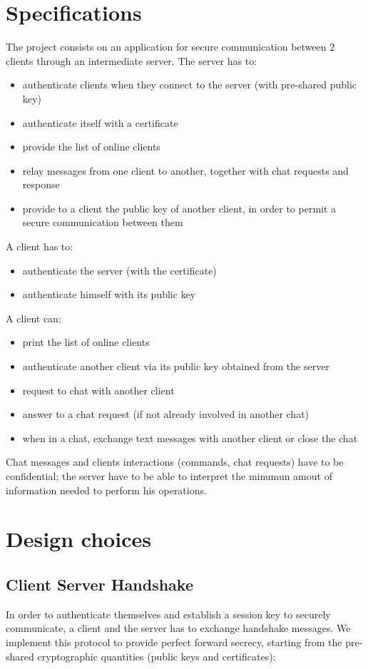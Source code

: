 \documentclass[11pt]{report}
\begin{document}
\chapter{Specifications}
	\noindent The project consists on an application for secure communication between 2 clients through an intermediate server.
	\newline
	The server has to:
	\begin{itemize}
		\item authenticate clients when they connect to the server (with pre-shared public key)
		\item authenticate itself with a certificate
		\item provide the list of online clients
		\item relay messages from one client to another, together with chat requests and response
		\item provide to a client the public key of another client, in order to permit a secure communication between them
	\end{itemize}
	A client has to:
	\begin{itemize}
		\item authenticate the server (with the certificate)
		\item authenticate himself with its public key
	\end{itemize}
	A client can:
	\begin{itemize}
		\item print the list of online clients
		\item authenticate another client via its public key obtained from the server
		\item request to chat with another client
		\item answer to a chat request (if not already involved in another chat)
		\item when in a chat, exchange text messages with another client or close the chat
	\end{itemize}
	Chat messages and clients interactions (commands, chat requests) have to be confidential; the
	server have to be able to interpret the minumun amout of information needed to perform his operations.
\newpage
\chapter{Design choices}
\section{Client Server Handshake}
In order to authenticate themselves and establish a session key to securely communicate, a client
and the server has to exchange handshake messages. We implement this protocol to provide perfect 
forward secrecy, starting from the pre-shared cryptographic quantities (public keys and certificates):
\end{document}
